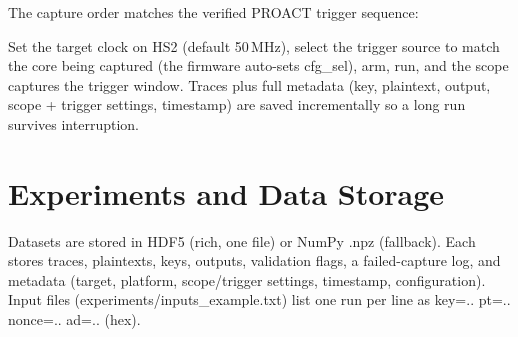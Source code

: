 \documentclass[11pt,a4paper]{report}
\newcommand{\code}[1]{{\ttfamily\small #1}}
\begin{document}
The capture order matches the verified PROACT trigger sequence:
\begin{center}
\end{center}
Set the target clock on HS2 (default 50\,MHz), select the trigger source to match
the core being captured (the firmware auto-sets \code{cfg\_sel}), arm, run, and
the scope captures the trigger window. Traces plus full metadata (key, plaintext,
output, scope + trigger settings, timestamp) are saved incrementally so a long
run survives interruption.

\chapter{Experiments and Data Storage}
Datasets are stored in HDF5 (rich, one file) or NumPy \code{.npz} (fallback).
Each stores traces, plaintexts, keys, outputs, validation flags, a failed-capture
log, and metadata (target, platform, scope/trigger settings, timestamp,
configuration). Input files (\code{experiments/inputs\_example.txt}) list one run
per line as \code{key=.. pt=.. nonce=.. ad=..} (hex).

\end{document}
